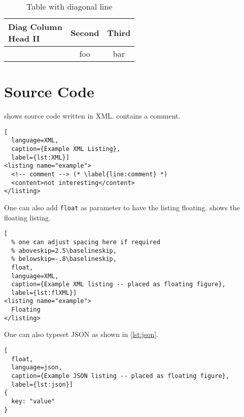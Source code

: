 \documentclass[
  fontsize=10pt
  numbers=noenddot,
  english,  %
  paper=a5,
  twoside,  %
  DIV=calc,
  headings=small,
  bibliography=totoc,
  listof=totoc,
  draft=false
]{scrbook}
\theoremstyle{break}
\begin{document}
\begin{ltgexample}
\begin{table}
\caption{Table with diagonal line}
\label{tab:diag}
\begin{center}
\begin{tabular}{|l|c|c|}
\hline
\diagbox[width=10em]{Diag\\Column Head I}{Diag Column\\Head II} & Second & Third \\
\hline
& foo & bar \\
\hline
\end{tabular}
\end{center}
\end{table}
\end{ltgexample}


\section{Source Code}

\begin{ltgexample}
 shows source code written in XML.
 contains a comment.

\begin{lstlisting}[
  language=XML,
  caption={Example XML Listing},
  label={lst:XML}]
<listing name="example">
  <!-- comment --> (* \label{line:comment} *)
  <content>not interesting</content>
</listing>
\end{lstlisting}
\end{ltgexample}

One can also add \verb+float+ as parameter to have the listing floating.
 shows the floating listing.

\begin{ltgexample}
\begin{lstlisting}[
  % one can adjust spacing here if required
  % aboveskip=2.5\baselineskip,
  % belowskip=-.8\baselineskip,
  float,
  language=XML,
  caption={Example XML listing -- placed as floating figure},
  label={lst:flXML}]
<listing name="example">
  Floating
</listing>
\end{lstlisting}
\end{ltgexample}

One can also typeset JSON as shown in \cref{lst:json}.

\begin{ltgexample}
\begin{lstlisting}[
  float,
  language=json,
  caption={Example JSON listing -- placed as floating figure},
  label={lst:json}]
{
  key: "value"
}
\end{lstlisting}
\end{ltgexample}
\end{document}
